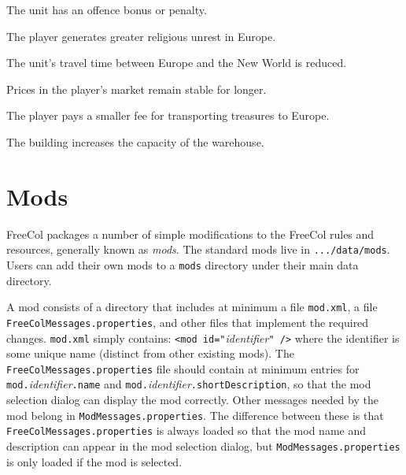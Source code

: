 \documentclass[12pt]{book}
\begin{document}
\affectsUnit

The unit has an offence bonus or penalty.

\affectsPlayer

The player generates greater religious unrest in Europe.

\affectsUnit

The unit's travel time between Europe and the New World is reduced.

\affectsPlayer

Prices in the player's market remain stable for longer.

\affectsPlayer

The player pays a smaller fee for transporting treasures to Europe.

\affectsBuilding

The building increases the capacity of the warehouse.

\hypertarget{Mods}{\chapter{Mods}}

FreeCol packages a number of simple modifications to the FreeCol rules
and resources, generally known as \emph{mods}.  The standard mods live
in \texttt{.../data/mods}.  Users can add their own mods to a
\texttt{mods} directory under their main data directory.

A mod consists of a directory that includes at minimum a file
\texttt{mod.xml}, a file \texttt{FreeColMessages.properties}, and
other files that implement the required changes.  \texttt{mod.xml}
simply contains: \texttt{<mod id="}\emph{identifier}\texttt{" />}
where the identifier is some unique name (distinct from other existing
mods).  The \texttt{FreeColMessages.properties} file should contain at
minimum entries for \texttt{mod.}\emph{identifier}\texttt{.name} 
and \texttt{mod.}\emph{identifier}\texttt{.shortDescription}, so that
the mod selection dialog can display the mod correctly.  Other
messages needed by the mod belong in \texttt{ModMessages.properties}.
The difference between these is that
\texttt{FreeColMessages.properties} is always loaded so that the mod
name and description can appear in the mod selection dialog, but
\texttt{ModMessages.properties} is only loaded if the mod is selected.
\end{document}
